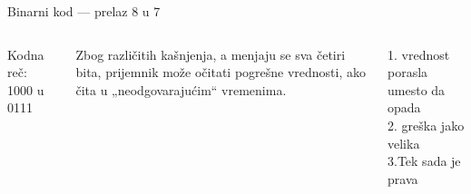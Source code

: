 \begin{frame}[label=06-s018]{Binarni kod — prelaz 8 u 7}
\fontsize{10}{12}\selectfont
\begin{columns}[c,onlytextwidth]
\centering
{}\centering
{}Kodna reč: 1000 u 0111\par\medskip
Zbog različitih kašnjenja, a menjaju se sva četiri bita, prijemnik može očitati pogrešne vrednosti, ako čita u „neodgovarajućim“ vremenima.\par\vspace{4mm}
1. vrednost porasla umesto da opada\\2. greška jako velika\\3.\quad Tek sada je prava
\end{columns}
\end{frame}
